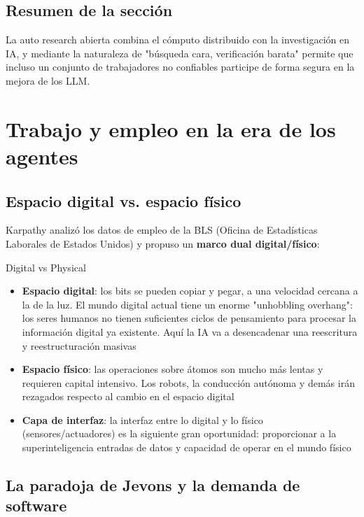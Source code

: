 \documentclass[a4paper]{article}
\begin{document}
\subsection{Resumen de la sección}

La auto research abierta combina el cómputo distribuido con la investigación en IA, y mediante la naturaleza de "búsqueda cara, verificación barata" permite que incluso un conjunto de trabajadores no confiables participe de forma segura en la mejora de los LLM.

\section{Trabajo y empleo en la era de los agentes}

\subsection{Espacio digital vs. espacio físico}

Karpathy analizó los datos de empleo de la BLS (Oficina de Estadísticas Laborales de Estados Unidos) y propuso un \textbf{marco dual digital/físico}:

\begin{importantbox}{Digital vs Physical}
\begin{itemize}
    \item \textbf{Espacio digital}: los bits se pueden copiar y pegar, a una velocidad cercana a la de la luz. El mundo digital actual tiene un enorme "unhobbling overhang": los seres humanos no tienen suficientes ciclos de pensamiento para procesar la información digital ya existente. Aquí la IA va a desencadenar una reescritura y reestructuración masivas
    \item \textbf{Espacio físico}: las operaciones sobre átomos son mucho más lentas y requieren capital intensivo. Los robots, la conducción autónoma y demás irán rezagados respecto al cambio en el espacio digital
    \item \textbf{Capa de interfaz}: la interfaz entre lo digital y lo físico (sensores/actuadores) es la siguiente gran oportunidad: proporcionar a la superinteligencia entradas de datos y capacidad de operar en el mundo físico
\end{itemize}
\end{importantbox}

\subsection{La paradoja de Jevons y la demanda de software}
\end{document}
